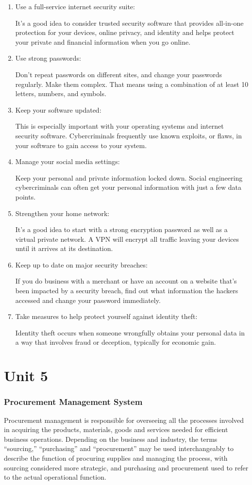 \documentclass[a4paper]{article}
\begin{document}
\begin{enumerate}
  \item Use a full-service internet security suite: 

It’s a good idea to consider trusted security software that provides all-in-one protection for your devices, online privacy, and identity and helps protect your private and financial information when you go online.
\item Use strong passwords: 

Don’t repeat passwords on different sites, and change your passwords regularly. Make them complex. That means using a combination of at least 10 letters, numbers, and symbols.
\item Keep your software updated: 

This is especially important with your operating systems and internet security software. Cybercriminals frequently use known exploits, or flaws, in your software to gain access to your system.
\item Manage your social media settings: 

Keep your personal and private information locked down. Social engineering cybercriminals can often get your personal information with just a few data points.
\item Strengthen your home network:


It’s a good idea to start with a strong encryption password as well as a virtual private network. A VPN will encrypt all traffic leaving your devices until it arrives at its destination.
\item Keep up to date on major security breaches:

If you do business with a merchant or have an account on a website that’s been impacted by a security breach, find out what information the hackers accessed and change your password immediately.

\item Take measures to help protect yourself against identity theft:

Identity theft occurs when someone wrongfully obtains your personal data in a way that involves fraud or deception, typically for economic gain.
\end{enumerate}

\part{Unit 5}
\section{Procurement Management System}
Procurement management is responsible for overseeing all the processes involved in acquiring the products, materials, goods and services needed for efficient business operations. Depending on the business and industry, the terms “sourcing,” “purchasing” and “procurement” may be used interchangeably to describe the function of procuring supplies and managing the process, with sourcing considered more strategic, and purchasing and procurement used to refer to the actual operational function.
\end{document}
